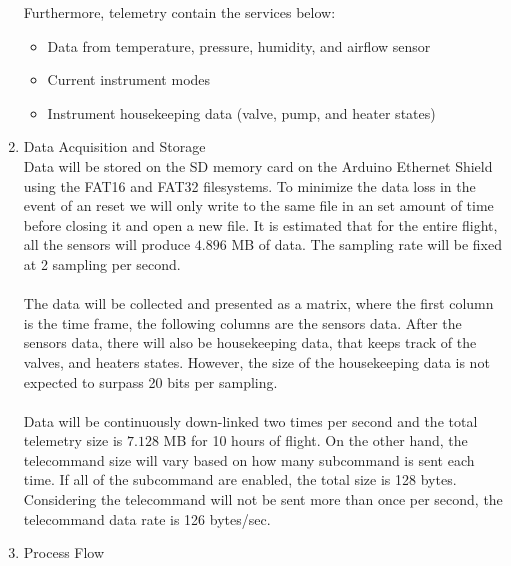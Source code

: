 \begin{enumerate}[label=(\alph*)]
Furthermore, telemetry contain the services below:
\begin{itemize}
    \item Data from temperature, pressure, humidity, and airflow sensor
    \item Current instrument modes
    \item Instrument housekeeping data (valve, pump, and heater states)
\end{itemize}
\item{Data Acquisition and Storage}\\
Data will be stored on the SD memory card on the Arduino Ethernet Shield using the FAT16 and FAT32 filesystems. To minimize the data loss in the event of an reset we will only write to the same file in an set amount of time before closing it and open a new file. It is estimated that for the entire flight, all the sensors will produce $4.896$ MB of data. The sampling rate will be fixed at 2 sampling per second.\\
\\
The data will be collected and presented as a matrix, where the first column is the time frame, the following columns are the sensors data. After the sensors data, there will also be housekeeping data, that keeps track of the valves, and heaters states. However, the size of the housekeeping data is not expected to surpass 20 bits per sampling.\\
\\
Data will be continuously down-linked two times per second and the total telemetry size is $7.128$ MB for 10 hours of flight. On the other hand, the telecommand size will vary based on how many subcommand is sent each time. If all of the subcommand are enabled, the total size is 128 bytes. Considering the telecommand will not be sent more than once per second, the telecommand data rate is 126 bytes/sec.
\item{Process Flow}\\

\end{enumerate}
